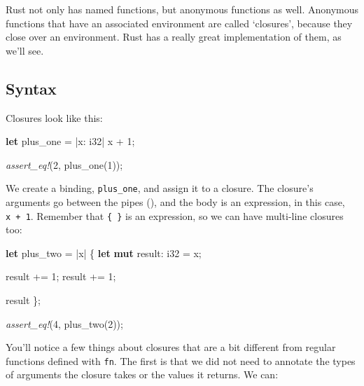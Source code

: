 \documentclass[a4paper,]{book}
\newenvironment{Shaded}{\begin{snugshade}}{\end{snugshade}}
\newcommand{\KeywordTok}[1]{\textcolor[rgb]{0.13,0.29,0.53}{\textbf{{#1}}}}
\newcommand{\DataTypeTok}[1]{\textcolor[rgb]{0.13,0.29,0.53}{{#1}}}
\newcommand{\DecValTok}[1]{\textcolor[rgb]{0.00,0.00,0.81}{{#1}}}
\newcommand{\PreprocessorTok}[1]{\textcolor[rgb]{0.56,0.35,0.01}{\textit{{#1}}}}
\newcommand{\NormalTok}[1]{{#1}}
\begin{document}

Rust not only has named functions, but anonymous functions as well.
Anonymous functions that have an associated environment are called
`closures', because they close over an environment. Rust has a really
great implementation of them, as we'll see.

\subsection{Syntax}\label{syntax}

Closures look like this:

\begin{Shaded}
\begin{Highlighting}[]
\KeywordTok{let} \NormalTok{plus_one = |x: }\DataTypeTok{i32}\NormalTok{| x + }\DecValTok{1}\NormalTok{;}

\PreprocessorTok{assert_eq!}\NormalTok{(}\DecValTok{2}\NormalTok{, plus_one(}\DecValTok{1}\NormalTok{));}
\end{Highlighting}
\end{Shaded}

We create a binding, \texttt{plus\_one}, and assign it to a closure. The
closure's arguments go between the pipes (\texttt{\textbar{}}), and the
body is an expression, in this case, \texttt{x\ +\ 1}. Remember that
\texttt{\{\ \}} is an expression, so we can have multi-line closures
too:

\begin{Shaded}
\begin{Highlighting}[]
\KeywordTok{let} \NormalTok{plus_two = |x| \{}
    \KeywordTok{let} \KeywordTok{mut} \NormalTok{result: }\DataTypeTok{i32} \NormalTok{= x;}

    \NormalTok{result += }\DecValTok{1}\NormalTok{;}
    \NormalTok{result += }\DecValTok{1}\NormalTok{;}

    \NormalTok{result}
\NormalTok{\};}

\PreprocessorTok{assert_eq!}\NormalTok{(}\DecValTok{4}\NormalTok{, plus_two(}\DecValTok{2}\NormalTok{));}
\end{Highlighting}
\end{Shaded}

You'll notice a few things about closures that are a bit different from
regular functions defined with \texttt{fn}. The first is that we did not
need to annotate the types of arguments the closure takes or the values
it returns. We can:
\end{document}
